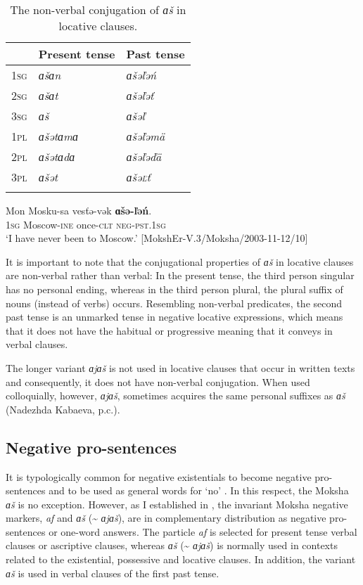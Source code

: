 \documentclass[output=paper,colorlinks,citecolor=brown,draft,draftmode]{langscibook}
\begin{document}
\begin{table}
\caption{The non-verbal conjugation of \textit{ɑš} in locative clauses.}
\label{tab:2:5}
\begin{tabular}{lll}
\lsptoprule
			&{Present tense}	&{Past tense}\\
\midrule
\textsc{1sg} &\textit{ɑšɑn}			&\textit{ɑšəľəń}\\
\textsc{2sg} &\textit{ɑšɑt}			&\textit{ɑšəľəť}\\
\textsc{3sg} &\textit{ɑš}			&\textit{ɑšəľ}\\
\textsc{1pl} &\textit{ɑšətɑmɑ}		&\textit{ɑšəľəmä}\\
\textsc{2pl} &\textit{ɑšətɑdɑ}		&\textit{ɑšəľəďä}\\
\textsc{3pl} &\textit{ɑšət}			&\textit{ɑšə\textsc{ľ}ť}\\
\lspbottomrule
\end{tabular}
\end{table}

\ea\label{ex:moksha-never-Moscow}
\gll Mon Mosku-sa vesťə-vək \textbf{ɑšə-ľəń}.\\
\textsc{1sg} Moscow-\textsc{ine} once-\textsc{clt} \textsc{neg-pst.1sg}\\
\glt `I have never been to Moscow.' [MokshEr-V.3/Moksha/2003-11-12/10]
\z

It is important to note that the conjugational properties of \textit{ɑš}
in locative clauses are non-verbal rather than verbal: In the present
tense, the third person singular has no personal ending, whereas in the
third person plural, the plural suffix of nouns (instead of verbs)
occurs. Resembling non-verbal predicates, the second past tense is an
unmarked tense in negative locative expressions, which means that it does
not have the habitual or progressive meaning that it conveys in verbal clauses.

  The longer variant \textit{ɑjɑš} is not used in locative clauses that occur in written texts and consequently, it does not have non-verbal conjugation. When used colloquially, however, \textit{ɑjɑš}, sometimes acquires the same personal suffixes as \textit{ɑš} (Nadezhda Kabaeva, p.c.).

\subsection{Negative pro-sentences}\label{sec:2:5.4}

It is typologically common for negative existentials to become negative pro-sen\-ten\-ces and to be used as general words for `no' \citep[127]{Veselinova2013}. In this respect, the Moksha \textit{ɑš} is no exception. However, as I established in \citet[270--271]{Hamari2007}, the invariant Moksha negative markers, \textit{af} and \textit{ɑš} (\textasciitilde{} \textit{ɑjɑš}), are in complementary distribution as negative pro-sentences or one-word answers. The particle \textit{af} is selected for present tense verbal clauses or ascriptive clauses, whereas \textit{ɑš} (\textasciitilde{} \textit{ɑjɑš}) is normally used in contexts related to the existential, possessive and locative clauses. In addition, the variant \textit{ɑš} is used in verbal clauses of the first past tense.
\end{document}
